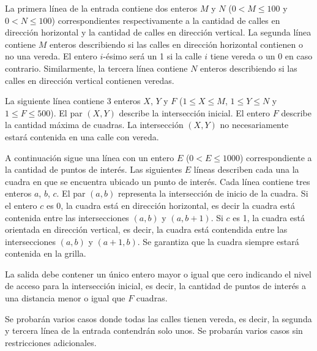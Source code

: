 \documentclass{oci}
\begin{document}
\begin{inputDescription}
  La primera línea de la entrada contiene dos enteros $M$ y $N$ ($0 < M \leq 100$ y $0 < N\leq 100$)
  correspondientes respectivamente a la cantidad de calles en dirección horizontal y la cantidad de
  calles en dirección vertical.
  La segunda línea contiene $M$ enteros describiendo si las calles en dirección horizontal
  contienen o no una vereda.
  El entero $i$-ésimo será un 1 si la calle $i$ tiene vereda o un 0 en caso contrario.
  Similarmente, la tercera línea contiene $N$ enteros describiendo si las calles en dirección
  vertical contienen veredas.

  La siguiente línea contiene 3 enteros $X$, $Y$ y $F$ ($1 \leq X \leq M$, $1 \leq Y \leq N$ y $1\leq F \leq 500$).
  El par $(X, Y)$ describe la intersección inicial.
  El entero $F$ describe la cantidad máxima de cuadras.
  La intersección $(X, Y)$ no necesariamente estará contenida en una calle con vereda.

  A continuación sigue una línea con un entero $E$ ($0 < E \leq 1000$) correspondiente a la cantidad
  de puntos de interés.
  Las siguientes $E$ líneas describen cada una la cuadra en que se encuentra ubicado un punto de interés.
  Cada línea contiene tres enteros $a$, $b$, $c$.
  El par $(a, b)$ representa la intersección de inicio de la cuadra.
  Si el entero $c$ es 0, la cuadra está en dirección horizontal, es decir la cuadra está contenida entre las
  intersecciones $(a, b)$ y $(a, b + 1)$.
  Si $c$ es 1, la cuadra está orientada en dirección vertical, es decir, la cuadra está contendida entre
  las intersecciones $(a, b)$ y $(a + 1, b)$.
  Se garantiza que la cuadra siempre estará contenida en la grilla.
\end{inputDescription}

\begin{outputDescription}
  La salida debe contener un único entero mayor o igual que cero indicando el nivel de acceso para
  la intersección inicial, es decir, la cantidad de puntos de interés a una distancia menor o igual
  que $F$ cuadras.
\end{outputDescription}

\begin{scoreDescription}
  Se probarán varios casos donde todas las calles tienen vereda, es decir, la segunda y tercera
  línea de la entrada contendrán solo unos.
  Se probarán varios casos sin restricciones adicionales.
\end{scoreDescription}

\begin{sampleDescription}
\end{sampleDescription}
\end{document}
